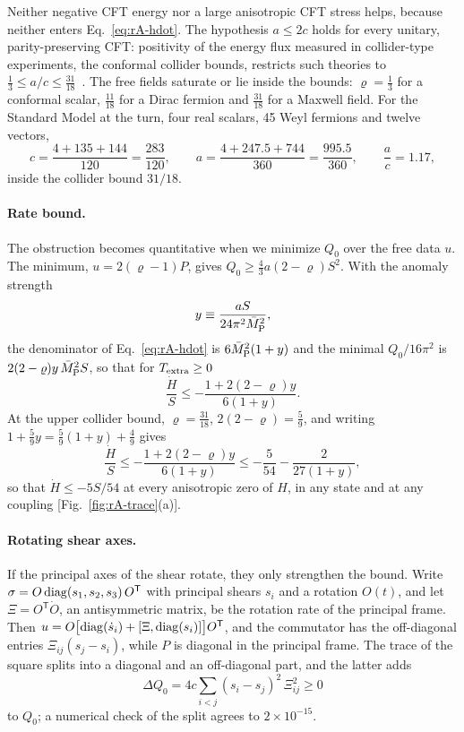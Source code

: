 Neither negative CFT energy nor a large anisotropic CFT stress helps, because neither enters Eq.~\eqref{eq:rA-hdot}.
The hypothesis $a\leq2c$ holds for every unitary, parity-preserving CFT: positivity of the energy flux measured in collider-type experiments, the conformal collider bounds, restricts such theories to $\tfrac13\leq a/c\leq\tfrac{31}{18}$~\cite{Hofman:2008ar,Hofman:2016awc}.
The free fields saturate or lie inside the bounds: $\varrho=\tfrac13$ for a conformal scalar, $\tfrac{11}{18}$ for a Dirac fermion and $\tfrac{31}{18}$ for a Maxwell field.
For the Standard Model at the turn, four real scalars, 45 Weyl fermions and twelve vectors,
\begin{equation}
c=\frac{4+135+144}{120}=\frac{283}{120},\qquad a=\frac{4+247.5+744}{360}=\frac{995.5}{360},\qquad \frac ac=1.17,
\label{eq:rA-SMac}
\end{equation}
inside the collider bound $31/18$. %

\paragraph{Rate bound.}
The obstruction becomes quantitative when we minimize $Q_0$ over the free data $u$.
The minimum, $u=2(\varrho-1)P$, gives $Q_0\geq\tfrac43a(2-\varrho)S^2$.
With the anomaly strength
\begin{equation}
y\equiv\frac{aS}{24\pi^2\bar M_{\mathrm{P}}^2},
\end{equation}
the denominator of Eq.~\eqref{eq:rA-hdot} is $6\bar M_{\mathrm{P}}^2(1+y)$ and the minimal $Q_0/16\pi^2$ is $2(2-\varrho)y\,\bar M_{\mathrm{P}}^2S$, so that for $T_{\rm extra}\geq0$
\begin{equation}
\frac{\dot H}{S}\leq-\frac{1+2(2-\varrho)y}{6(1+y)} .
\end{equation}
At the upper collider bound, $\varrho=\tfrac{31}{18}$, $2(2-\varrho)=\tfrac59$, and writing $1+\tfrac59y=\tfrac59(1+y)+\tfrac49$ gives
\begin{equation}
\frac{\dot H}{S}\leq-\frac{1+2(2-\varrho)y}{6(1+y)}\leq-\frac5{54}-\frac{2}{27(1+y)},
\label{eq:rA-rate}
\end{equation}
so that $\dot H\leq-5S/54$ at every anisotropic zero of $H$, in any state and at any coupling [Fig.~\ref{fig:rA-trace}(a)]. %

\paragraph{Rotating shear axes.}
If the principal axes of the shear rotate, they only strengthen the bound.
Write $\sigma=O\,{\rm diag}(s_1,s_2,s_3)\,O^{\mathsf T}$ with principal shears $s_i$ and a rotation $O(t)$, and let $\Xi=O^{\mathsf T}\dot O$, an antisymmetric matrix, be the rotation rate of the principal frame.
Then $u=O\big[{\rm diag}(\dot s_i)+[\Xi,{\rm diag}(s_i)]\big]O^{\mathsf T}$, and the commutator has the off-diagonal entries $\Xi_{ij}(s_j-s_i)$, while $P$ is diagonal in the principal frame.
The trace of the square splits into a diagonal and an off-diagonal part, and the latter adds
\begin{equation}
\Delta Q_0=4c\sum_{i<j}(s_i-s_j)^2\,\Xi_{ij}^2\geq0
\end{equation}
to $Q_0$; a numerical check of the split agrees to $2\times10^{-15}$. %

